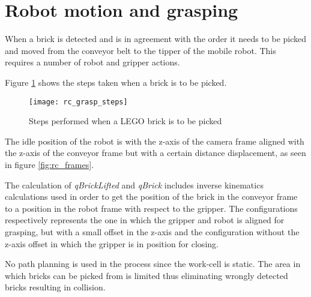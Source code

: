 \section{Robot motion and grasping}
\label{sec:rc_grasp}
When a brick is detected and is in agreement with the order it needs to be picked and moved from the conveyor belt to the tipper of the mobile robot. This requires a number of robot and gripper actions. 

Figure \ref{fig:rc_grasp} shows the steps taken when a brick is to be picked. 

	\begin{figure}[H]
		\centering
	    \texttt{[image: rc\_grasp\_steps]}
	    \caption{Steps performed when a LEGO brick is to be picked}
		\label{fig:rc_grasp}
	\end{figure}
		
The idle position of the robot is with the z-axis of the camera frame aligned with the z-axis of the conveyor frame but with a certain distance displacement, as seen in figure \ref{fig:rc_frames}.

The calculation of \textit{qBrickLifted} and \textit{qBrick} includes inverse kinematics calculations used in order to get the position of the brick in the conveyor frame to a position in the robot frame with respect to the gripper. The configurations respectively represents the one in which the gripper and robot is aligned for grasping, but with a small offset in the z-axis and the configuration without the z-axis offset in which the gripper is in position for closing.  

No path planning is used in the process since the work-cell is static. The area in which bricks can be picked from is limited thus eliminating wrongly detected bricks resulting in collision. 

